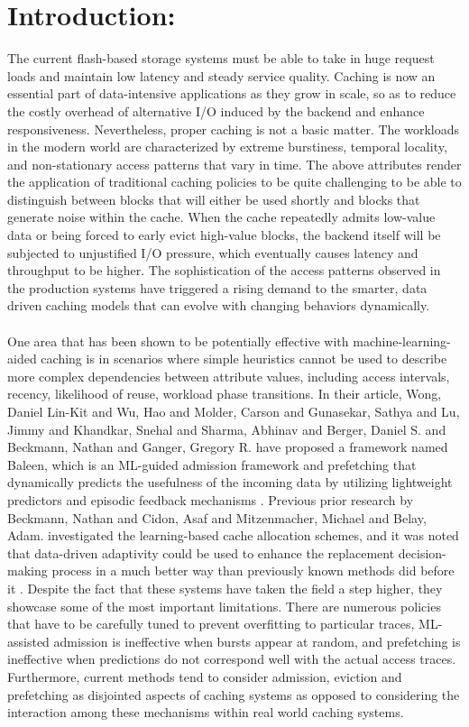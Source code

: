 \documentclass[sigconf]{acmart}
\begin{document}
{\section{Introduction:}
\large The current flash-based storage systems must be able to take in huge request loads and maintain low latency and steady service quality. Caching is now an essential part of data-intensive applications as they grow in scale, so as to reduce the costly overhead of alternative I/O induced by the backend and enhance responsiveness. Nevertheless, proper caching is not a basic matter. The workloads in the modern world are characterized by extreme burstiness, temporal locality, and non-stationary access patterns that vary in time. The above attributes render the application of traditional caching policies to be quite challenging to be able to distinguish between blocks that will either be used shortly and blocks that generate noise within the cache. When the cache repeatedly admits low-value data or being forced to early evict high-value blocks, the backend itself will be subjected to unjustified I/O pressure, which eventually causes latency and throughput to be higher. The sophistication of the access patterns observed in the production systems have triggered a rising demand to the smarter, data driven caching models that can evolve with changing behaviors dynamically.\\
\\One area that has been shown to be potentially effective with machine-learning-aided caching is in scenarios where simple heuristics cannot be used to describe more complex dependencies between attribute values, including access intervals, recency, likelihood of reuse, workload phase transitions. In their article, Wong, Daniel Lin-Kit and Wu, Hao and Molder, Carson and Gunasekar, Sathya and Lu, Jimmy and Khandkar, Snehal and Sharma, Abhinav and Berger, Daniel S. and Beckmann, Nathan and Ganger, Gregory R. have proposed a framework named Baleen, which is an ML-guided admission framework and prefetching that dynamically predicts the usefulness of the incoming data by utilizing lightweight predictors and episodic feedback mechanisms \cite{baleen_artifact}. Previous prior research by Beckmann, Nathan and Cidon, Asaf and Mitzenmacher, Michael and Belay, Adam. investigated the learning-based cache allocation schemes, and it was noted that data-driven adaptivity could be used to enhance the replacement decision-making process in a much better way than previously known methods did before it \cite{beckmann2015optimizing}. Despite the fact that these systems have taken the field a step higher, they showcase some of the most important limitations. There are numerous policies that have to be carefully tuned to prevent overfitting to particular traces, ML-assisted admission is ineffective when bursts appear at random, and prefetching is ineffective when predictions do not correspond well with the actual access traces. Furthermore, current methods tend to consider admission, eviction and prefetching as disjointed aspects of caching systems as opposed to considering the interaction among these mechanisms within real world caching systems.\\
}
\end{document}
